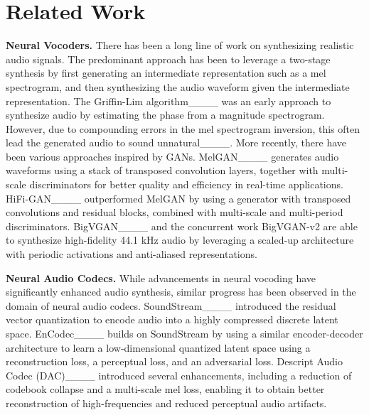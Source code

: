 \section{Related Work}
\label{sec:related-work}

\textbf{Neural Vocoders.} There has been a long line of work on synthesizing realistic audio signals. The predominant approach has been to leverage a two-stage synthesis by first generating an intermediate representation such as a mel spectrogram, and then synthesizing the audio waveform given the intermediate representation. The Griffin-Lim algorithm____ was an early approach to synthesize audio by estimating the phase from a magnitude spectrogram. However, due to compounding errors in the mel spectrogram inversion, this often lead the generated audio to sound unnatural____. More recently, there have been various approaches inspired by GANs. MelGAN____ generates audio waveforms using a stack of transposed convolution layers, together with multi-scale discriminators for better quality and efficiency in real-time applications. HiFi-GAN____ outperformed MelGAN by using a generator with transposed convolutions and residual blocks, combined with multi-scale and multi-period discriminators. BigVGAN____ and the concurrent work BigVGAN-v2 are able to synthesize high-fidelity 44.1 kHz audio by leveraging a scaled-up architecture with periodic activations and anti-aliased representations.

\textbf{Neural Audio Codecs.} While advancements in neural vocoding have significantly enhanced audio synthesis, similar progress has been observed in the domain of neural audio codecs. SoundStream____ introduced the residual vector quantization to encode audio into a highly compressed discrete latent space. EnCodec____ builds on SoundStream by using a similar encoder-decoder architecture to learn a low-dimensional quantized latent space using a reconstruction loss, a perceptual loss, and an adversarial loss. Descript Audio Codec (DAC)____ introduced several enhancements, including a reduction of codebook collapse and a multi-scale mel loss, enabling it to obtain better reconstruction of high-frequencies and reduced perceptual audio artifacts.